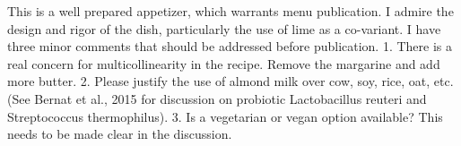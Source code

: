 \documentclass[12pt]{sigbovik-review}
\author{See Em You, Ph.D.}
\begin{document}
\maketitle

This is a well prepared appetizer, which warrants menu publication. I admire the design and rigor of the dish, particularly the use of lime as a co-variant. I have three minor comments that should be addressed before publication.
1. There is a real concern for multicollinearity in the recipe. Remove the margarine and add more butter.
2.  Please justify the use of almond milk over cow, soy, rice, oat, etc. (See Bernat et al., 2015 for discussion on probiotic Lactobacillus reuteri and Streptococcus thermophilus).
3. Is a vegetarian or vegan option available? This needs to be made clear in the discussion.
\end{document}
